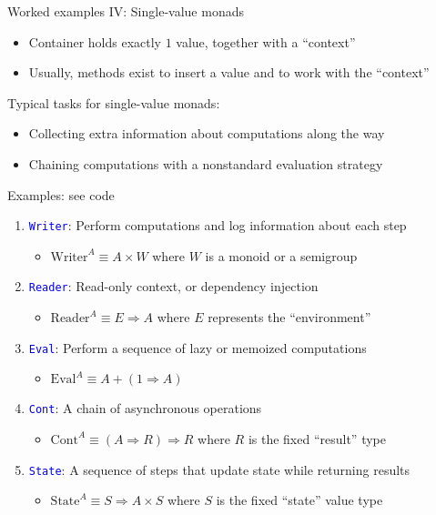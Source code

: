 \documentclass[english]{beamer}
\begin{document}
\begin{frame}{Worked examples IV: Single-value monads}

\begin{itemize}
\item Container holds exactly $1$ value, together with a ``context''
\item Usually, methods exist to insert a value and to work with the ``context''
\end{itemize}
Typical tasks for single-value monads:
\begin{itemize}
\item Collecting extra information about computations along the way
\item Chaining computations with a nonstandard evaluation strategy
\end{itemize}
Examples: see code
\begin{enumerate}
\item \texttt{\textcolor{blue}{\footnotesize{}Writer}}: Perform computations
and log information about each step
\begin{itemize}
\item $\text{Writer}^{A}\equiv A\times W$ where $W$ is a monoid or a semigroup
\end{itemize}
\item \texttt{\textcolor{blue}{\footnotesize{}Reader}}: Read-only context,
or dependency injection
\begin{itemize}
\item $\text{Reader}^{A}\equiv E\Rightarrow A$ where $E$ represents the
``environment''
\end{itemize}
\item \texttt{\textcolor{blue}{\footnotesize{}Eval}}: Perform a sequence
of lazy or memoized computations
\begin{itemize}
\item $\text{Eval}^{A}\equiv A+\left(1\Rightarrow A\right)$
\end{itemize}
\item \texttt{\textcolor{blue}{\footnotesize{}Cont}}: A chain of asynchronous
operations
\begin{itemize}
\item $\text{Cont}^{A}\equiv\left(A\Rightarrow R\right)\Rightarrow R$ where
$R$ is the fixed ``result'' type
\end{itemize}
\item \texttt{\textcolor{blue}{\footnotesize{}State}}: A sequence of steps
that update state while returning results
\begin{itemize}
\item $\text{State}^{A}\equiv S\Rightarrow A\times S$ where $S$ is the
fixed ``state'' value type
\end{itemize}
\end{enumerate}
\end{frame}
\end{document}
